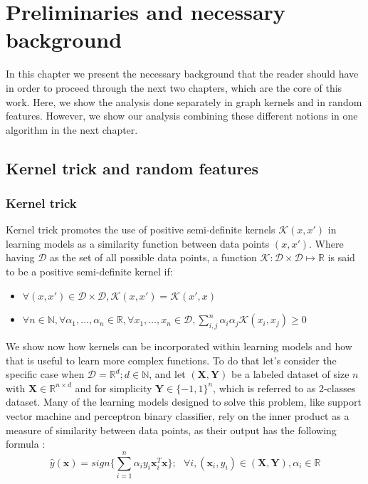 \chapter{Preliminaries and necessary background}
\label{chapter:background}
\newtheorem{theorem}{Theorem}
In this chapter we present the necessary background that the reader should have in order to proceed through the next two chapters, which are the core of this work. Here, we show the analysis done separately in graph kernels and in random features. However, we show our analysis combining these different notions in one algorithm in the next chapter.
\section{Kernel trick and random features}

\subsection{Kernel trick}
Kernel trick promotes the use of  positive semi-definite kernels $\mathcal{K}(x,x')$ in learning models as a similarity function between data points $(x,x')$. Where having $\mathcal{D}$ as the set of all possible data points, a function $\mathcal{K}:\mathcal{D}\times\mathcal{D}\mapsto\mathbb{R}$ is said to be a positive semi-definite kernel if:
\begin{itemize}
    \item $\forall (x,x')\in\mathcal{D}\times\mathcal{D}, \mathcal{K}(x,x')=\mathcal{K}(x',x)$
    \item $\forall n\in \mathbb{N}, \forall \alpha_1,\ldots,\alpha_n\in \mathbb{R},\forall x_1,\ldots,x_n\in \mathcal{D},\sum_{i,j}^n\alpha_i\alpha_j\mathcal{K}(x_i,x_j)\geq 0$
\end{itemize}
We show now how kernels can be incorporated within learning models and how that is useful to learn more complex functions. To do that let's consider the specific case when $\mathcal{D}=\mathbb{R}^d; d\in\mathbb{N}$, and let $(\mathbf{X},\mathbf{Y})$ be a labeled dataset of size $n$ with $\mathbf{X}\in \mathbb{R}^{n\times d} $ and for simplicity $\mathbf{Y}\in \{-1,1\}^n$, which is referred to as 2-classes dataset. Many of the learning models designed to solve this problem, like support vector machine and perceptron binary classifier, rely on the inner product as a measure of similarity between data points, as their output has the following formula \citep{inner_product}:
\begin{equation}
\label{eq:inner_product}
 \hat{y}(\mathbf{x})=sign\{\sum_{i=1}^n\alpha_iy_i\mathbf{x}_i^T\mathbf{x}\}; ~~~\forall i, (\mathbf{x}_i,y_i)\in (\mathbf{X,Y}),\alpha_i\in \mathbb{R}
\end{equation}

